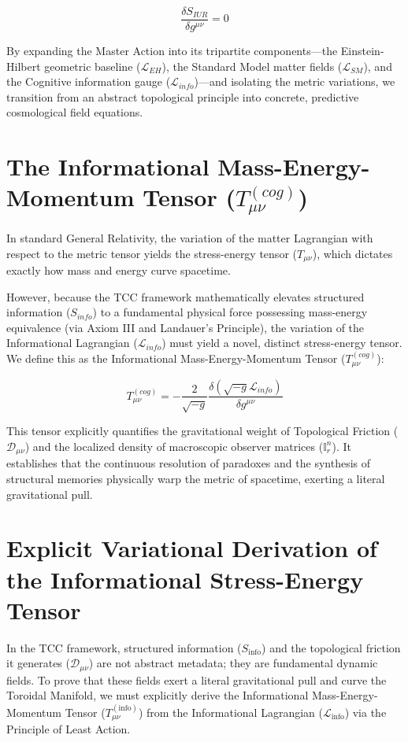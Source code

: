 \documentclass[12pt,openany]{book}
\theoremstyle{plain}
\theoremstyle{definition}
\theoremstyle{remark}
\begin{document}
\begin{equation}
\frac{\delta S_{IUR}}{\delta g^{\mu\nu}} = 0
\end{equation}

By expanding the Master Action into its tripartite components—the Einstein-Hilbert geometric baseline ($\mathcal{L}_{EH}$), the Standard Model matter fields ($\mathcal{L}_{SM}$), and the Cognitive information gauge ($\mathcal{L}_{info}$)—and isolating the metric variations, we transition from an abstract topological principle into concrete, predictive cosmological field equations.

\section{The Informational Mass-Energy-Momentum Tensor ($T_{\mu\nu}^{(cog)}$)}

In standard General Relativity, the variation of the matter Lagrangian with respect to the metric tensor yields the stress-energy tensor ($T_{\mu\nu}$), which dictates exactly how mass and energy curve spacetime. 

However, because the TCC framework mathematically elevates structured information ($S_{info}$) to a fundamental physical force possessing mass-energy equivalence (via Axiom III and Landauer's Principle), the variation of the Informational Lagrangian ($\mathcal{L}_{info}$) must yield a novel, distinct stress-energy tensor. We define this as the Informational Mass-Energy-Momentum Tensor ($T_{\mu\nu}^{(cog)}$):

\begin{equation}
T_{\mu\nu}^{(cog)} = -\frac{2}{\sqrt{-g}} \frac{\delta(\sqrt{-g}\mathcal{L}_{info})}{\delta g^{\mu\nu}}
\end{equation}

This tensor explicitly quantifies the gravitational weight of Topological Friction ($\mathcal{D}_{\mu\nu}$) and the localized density of macroscopic observer matrices ($\mathbb{I}_r^n$). It establishes that the continuous resolution of paradoxes and the synthesis of structural memories physically warp the metric of spacetime, exerting a literal gravitational pull.

\section{Explicit Variational Derivation of the Informational Stress-Energy Tensor}

In the TCC framework, structured information ($S_{\text{info}}$) and the topological friction it generates ($\mathcal{D}_{\mu\nu}$) are not abstract metadata; they are fundamental dynamic fields. To prove that these fields exert a literal gravitational pull and curve the Toroidal Manifold, we must explicitly derive the Informational Mass-Energy-Momentum Tensor ($T_{\mu\nu}^{(\text{info})}$) from the Informational Lagrangian ($\mathcal{L}_{\text{info}}$) via the Principle of Least Action.
\end{document}
